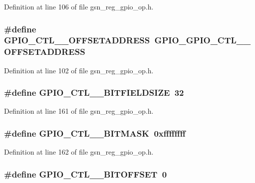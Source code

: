 Definition at line 106 of file gsn\_\-reg\_\-gpio\_\-op.h.

\hypertarget{a00553_af519844b13cb8394785848c346179798}{
\subsubsection[{GPIO\_\-CTL\_\-0\_\-OFFSETADDRESS}]{\setlength{\rightskip}{0pt plus 5cm}\#define GPIO\_\-CTL\_\_\-OFFSETADDRESS~GPIO\_\-GPIO\_\-CTL\_\_\-OFFSETADDRESS}}
\label{a00553_af519844b13cb8394785848c346179798}


Definition at line 102 of file gsn\_\-reg\_\-gpio\_\-op.h.

\hypertarget{a00553_a6adbeda65f78e3332570cc15358cfd57}{
\subsubsection[{GPIO\_\-CTL\_\-1\_\-BITFIELDSIZE}]{\setlength{\rightskip}{0pt plus 5cm}\#define GPIO\_\-CTL\_\_\-BITFIELDSIZE~32}}
\label{a00553_a6adbeda65f78e3332570cc15358cfd57}


Definition at line 161 of file gsn\_\-reg\_\-gpio\_\-op.h.

\hypertarget{a00553_a881d68236f50a224ed69bfd6f86818d9}{
\subsubsection[{GPIO\_\-CTL\_\-1\_\-BITMASK}]{\setlength{\rightskip}{0pt plus 5cm}\#define GPIO\_\-CTL\_\_\-BITMASK~0xffffffff}}
\label{a00553_a881d68236f50a224ed69bfd6f86818d9}


Definition at line 162 of file gsn\_\-reg\_\-gpio\_\-op.h.

\hypertarget{a00553_ad5144dff63728f84107c63df4ca00501}{
\subsubsection[{GPIO\_\-CTL\_\-1\_\-BITOFFSET}]{\setlength{\rightskip}{0pt plus 5cm}\#define GPIO\_\-CTL\_\_\-BITOFFSET~0}}
\label{a00553_ad5144dff63728f84107c63df4ca00501}


